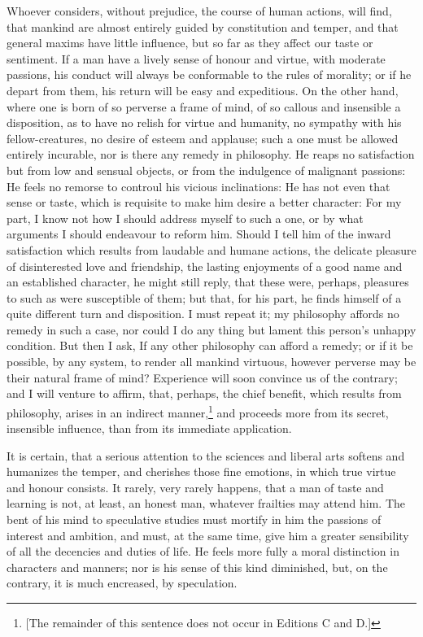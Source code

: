 Whoever considers, without prejudice, the course of human actions,
will find, that mankind are almost entirely guided by constitution and
temper, and that general maxims have little influence, but so far as
they affect our taste or sentiment. If a man have a lively sense of
honour and virtue, with moderate passions, his conduct will always be
conformable to the rules of morality; or if he depart from them, his
return will be easy and expeditious. On the other hand, where one is
born of so perverse a frame of mind, of so callous and insensible a
disposition, as to have no relish for virtue and humanity, no sympathy
with his fellow-creatures, no desire of esteem and applause; such a
one must be allowed entirely incurable, nor is there any remedy in
philosophy. He reaps no satisfaction but from low and sensual objects,
or from the indulgence of malignant passions: He feels no remorse to
controul his vicious inclinations: He has not even that sense or
taste, which is requisite to make him desire a better character: For
my part, I know not how I should address myself to such a one, or by
what arguments I should endeavour to reform him. Should I tell him of
the inward satisfaction which results from laudable and humane
actions, the delicate pleasure of disinterested love and friendship,
the lasting enjoyments of a good name and an established character, he
might still reply, that these were, perhaps, pleasures to such as were
susceptible of them; but that, for his part, he finds himself of a
quite different turn and disposition. I must repeat it; my philosophy
affords no remedy in such a case, nor could I do any thing but lament
this person's unhappy condition. But then I ask, If any other
philosophy can afford a remedy; or if it be possible, by any system,
to render all mankind virtuous, however perverse may be their natural
frame of mind? Experience will soon convince us of the contrary; and I
will venture to affirm, that, perhaps, the chief benefit, which
results from  philosophy, arises in an indirect
manner,\footnote{[The remainder of this sentence does not occur in
Editions C and D.]} and proceeds more from its secret, insensible
influence, than from its immediate application.

It is certain, that a serious attention to the sciences and liberal
arts softens and humanizes the temper, and cherishes those fine
emotions, in which true virtue and honour consists. It rarely, very
rarely happens, that a man of taste and learning is not, at least, an
honest man, whatever frailties may attend him. The bent of his mind to
speculative studies must mortify in him the passions of interest and
ambition, and must, at the same time, give him a greater sensibility
of all the decencies and duties of life. He feels more fully a moral
distinction in characters and manners; nor is his sense of this kind
diminished, but, on the contrary, it is much encreased, by
speculation.

